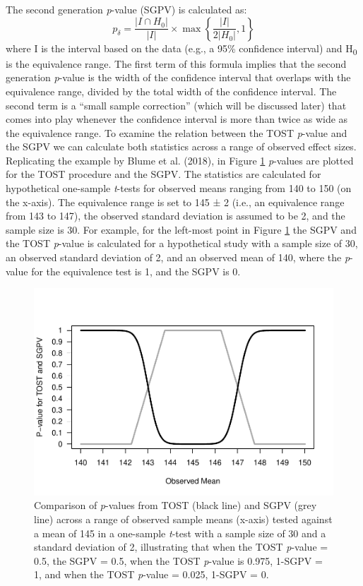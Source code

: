 \documentclass[,man,floatsintext]{apa6}
\begin{document}
The second generation \emph{p}-value (SGPV) is calculated as: \[
  p _ { \delta } = \frac { \left| I \cap H _ { 0 } \right| } { | I | } \times \max \left\{ \frac { | I | } { 2 \left| H _ { 0 } \right| } , 1 \right\}
\] where I is the interval based on the data (e.g., a 95\% confidence
interval) and H\textsubscript{0} is the equivalence range. The first
term of this formula implies that the second generation \emph{p}-value
is the width of the confidence interval that overlaps with the
equivalence range, divided by the total width of the confidence
interval. The second term is a \enquote{small sample correction} (which
will be discussed later) that comes into play whenever the confidence
interval is more than twice as wide as the equivalence range. To examine
the relation between the TOST \emph{p}-value and the SGPV we can
calculate both statistics across a range of observed effect sizes.
Replicating the example by Blume et al. (2018), in Figure
\ref{fig:TOSTSGPV1} \emph{p}-values are plotted for the TOST procedure
and the SGPV. The statistics are calculated for hypothetical one-sample
\emph{t}-tests for observed means ranging from 140 to 150 (on the
x-axis). The equivalence range is set to 145 ± 2 (i.e., an equivalence
range from 143 to 147), the observed standard deviation is assumed to be
2, and the sample size is 30. For example, for the left-most point in
Figure \ref{fig:TOSTSGPV1} the SGPV and the TOST \emph{p}-value is
calculated for a hypothetical study with a sample size of 30, an
observed standard deviation of 2, and an observed mean of 140, where the
\emph{p}-value for the equivalence test is 1, and the SGPV is 0.

\begin{figure}
\centering
\includegraphics{manuscript.R1_files/figure-latex/TOSTSGPV1-1.pdf}
\caption{\label{fig:TOSTSGPV1}Comparison of \emph{p}-values from TOST (black
line) and SGPV (grey line) across a range of observed sample means
(x-axis) tested against a mean of 145 in a one-sample \emph{t}-test with
a sample size of 30 and a standard deviation of 2, illustrating that
when the TOST \emph{p}-value = 0.5, the SGPV = 0.5, when the TOST
\emph{p}-value is 0.975, 1-SGPV = 1, and when the TOST \emph{p}-value =
0.025, 1-SGPV = 0.}
\end{figure}
\end{document}
